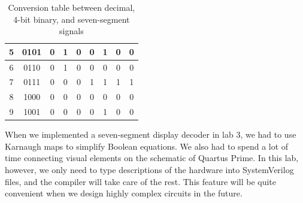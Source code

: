 \documentclass[12pt]{article}
\begin{document}
\begin{table}[ht]
\begin{tabular}{ | c | c | c | c | c | c | c | c | c | }
  5                                                                      & 0101                                                                    & 0                             & 1                             & 0                             & 0                             & 1                             & 0                             & 0                             \\ \hline
  6                                                                      & 0110                                                                    & 0                             & 1                             & 0                             & 0                             & 0                             & 0                             & 0                             \\ \hline
  7                                                                      & 0111                                                                    & 0                             & 0                             & 0                             & 1                             & 1                             & 1                             & 1                             \\ \hline
  8                                                                      & 1000                                                                    & 0                             & 0                             & 0                             & 0                             & 0                             & 0                             & 0                             \\ \hline
  9                                                                      & 1001                                                                    & 0                             & 0                             & 0                             & 0                             & 1                             & 0                             & 0                             \\ \hline
  \end{tabular}
  \caption{Conversion table between decimal, 4-bit binary, and seven-segment signals}
  \label{table:1}
\end{table}

\newpage

When we implemented a seven-segment display decoder in lab 3, we had to use Karnaugh maps to simplify Boolean equations. We also had to spend a lot of time connecting visual elements on the schematic of Quartus Prime. In this lab, however, we only need to type descriptions of the hardware into SystemVerilog files, and the compiler will take care of the rest. This feature will be quite convenient when we design highly complex circuits in the future.
\end{document}
